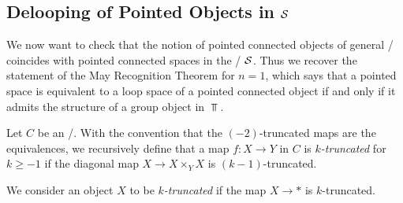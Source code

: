 \subsection*{Delooping of Pointed Objects in $\mathcal{S}$}
We now want to check that the notion of pointed connected objects of general \inftytops/ coincides with pointed connected spaces in the \inftytop/ $\mathcal{S}$.
Thus we recover the statement of the May Recognition Theorem for $n=1$, which says that a pointed space is equivalent to a loop space of a pointed connected object if and only if it admits the structure of a group object in $\Top$. 
\begin{definition}
    Let $C$ be an \inftytop/.
    With the convention that the $(-2)$-truncated maps are the equivalences, we recursively define that a map $f\colon X\to Y$ in $C$ is \emph{$k$-truncated} for $k\geq -1$ if the diagonal map $X\to X\times_YX$ is $(k-1)$-truncated.
    
    We consider an object $X$ to be \emph{$k$-truncated} if the map $X\to *$ is $k$-truncated.
\end{definition}
